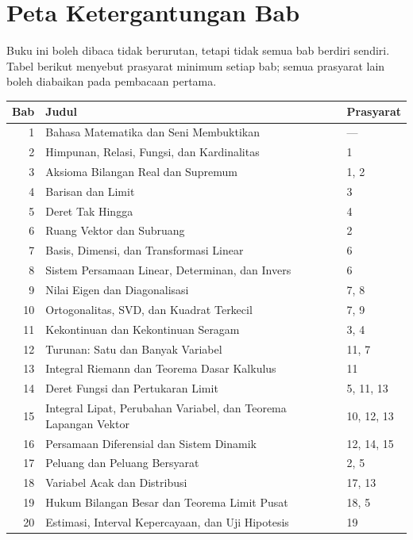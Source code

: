 \chapter*{Peta Ketergantungan Bab}

Buku ini boleh dibaca tidak berurutan, tetapi tidak semua bab berdiri sendiri.
Tabel berikut menyebut prasyarat minimum setiap bab; semua prasyarat lain boleh
diabaikan pada pembacaan pertama.

\begin{center}
\small
\begin{tabular}{@{}r p{9.0cm} p{2.8cm}@{}}
\toprule
\textbf{Bab} & \textbf{Judul} & \textbf{Prasyarat} \\
\midrule
1 & Bahasa Matematika dan Seni Membuktikan & --- \\
2 & Himpunan, Relasi, Fungsi, dan Kardinalitas & 1 \\
3 & Aksioma Bilangan Real dan Supremum & 1, 2 \\
4 & Barisan dan Limit & 3 \\
5 & Deret Tak Hingga & 4 \\
6 & Ruang Vektor dan Subruang & 2 \\
7 & Basis, Dimensi, dan Transformasi Linear & 6 \\
8 & Sistem Persamaan Linear, Determinan, dan Invers & 6 \\
9 & Nilai Eigen dan Diagonalisasi & 7, 8 \\
10 & Ortogonalitas, SVD, dan Kuadrat Terkecil & 7, 9 \\
11 & Kekontinuan dan Kekontinuan Seragam & 3, 4 \\
12 & Turunan: Satu dan Banyak Variabel & 11, 7 \\
13 & Integral Riemann dan Teorema Dasar Kalkulus & 11 \\
14 & Deret Fungsi dan Pertukaran Limit & 5, 11, 13 \\
15 & Integral Lipat, Perubahan Variabel, dan Teorema Lapangan Vektor & 10, 12, 13 \\
16 & Persamaan Diferensial dan Sistem Dinamik & 12, 14, 15 \\
17 & Peluang dan Peluang Bersyarat & 2, 5 \\
18 & Variabel Acak dan Distribusi & 17, 13 \\
19 & Hukum Bilangan Besar dan Teorema Limit Pusat & 18, 5 \\
20 & Estimasi, Interval Kepercayaan, dan Uji Hipotesis & 19 \\

\end{tabular}
\end{center}
